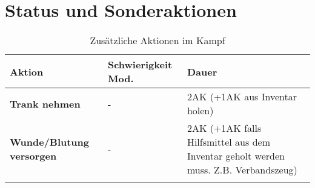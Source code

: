 \section{Status und Sonderaktionen}
\begin{longtable}{|p{4cm}|p{5cm}|p{6.5cm}|}
\hline
\textbf{Aktion} & \textbf{Schwierigkeit Mod.} & \textbf{Dauer} \\

\hline
\textbf{Trank nehmen} & - & 2AK (+1AK aus Inventar holen) \\

\hline
\textbf{Wunde/Blutung versorgen} & - & 2AK (+1AK falls Hilfsmittel aus dem Inventar geholt werden muss. Z.B. Verbandszeug) \\

\hline
\caption{Zusätzliche Aktionen im Kampf}
\label{tab:ZusätzlicheAktionen}
\end{longtable}

